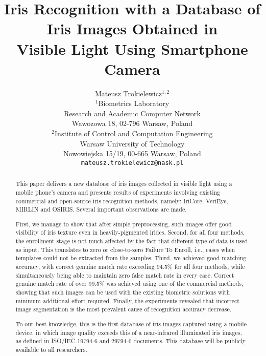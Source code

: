 \documentclass[10pt,twocolumn,letterpaper]{article}
\begin{document}
\title{Iris Recognition with a Database of Iris Images Obtained in \\Visible Light Using Smartphone Camera}

\author{Mateusz Trokielewicz$^{1,2}$\\
$^{1}$Biometrics Laboratory\\
Research and Academic Computer Network\\
Wawozowa 18, 02-796 Warsaw, Poland\\
$^{2}$Institute of Control and Computation Engineering\\
Warsaw University of Technology\\
Nowowiejska 15/19, 00-665 Warsaw, Poland\\
{\tt\small mateusz.trokielewicz@nask.pl}}

\maketitle
\thispagestyle{empty}

\begin{abstract}
This paper delivers a new database of iris images collected in visible light using a mobile phone's camera and presents results of experiments involving existing commercial and open-source iris recognition methods, namely: IriCore, VeriEye, MIRLIN and OSIRIS. Several important observations are made. 

First, we manage to show that after simple preprocessing, such images offer good visibility of iris texture even in heavily-pigmented irides. Second, for all four methods, the enrollment stage is not much affected by the fact that different type of data is used as input. This translates to zero or close-to-zero Failure To Enroll, i.e., cases when templates could not be extracted from the samples. Third, we achieved good matching accuracy, with correct genuine match rate exceeding 94.5\% for all four methods, while simultaneously being able to maintain zero false match rate in every case. Correct genuine match rate of over 99.5\% was achieved using one of the commercial methods, showing that such images can be used with the existing biometric solutions with minimum additional effort required. Finally, the experiments revealed that incorrect image segmentation is the most prevalent cause of recognition accuracy decrease.

To our best knowledge, this is the first database of iris images captured using a mobile device, in which image quality exceeds this of a near-infrared illuminated iris images, as defined in ISO/IEC 19794-6 and 29794-6 documents. This database will be publicly available to all researchers.

\end{abstract}
\end{document}

